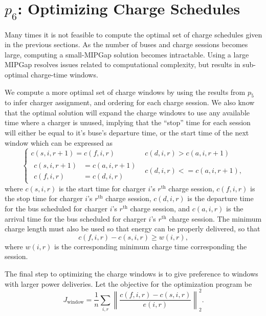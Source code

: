 \section{$p_6$: Optimizing Charge Schedules\label{sec:optimizingChargeSchedules}}
Many times it is not feasible to compute the optimal set of charge schedules given in the previous sections. As the number of buses and charge sessions becomes large, computing a small-MIPGap solution becomes intractable. Using a large MIPGap resolves issues related to computational complexity, but results in sub-optimal charge-time windows.
\par We compute a more optimal set of charge windows by using the results from $p_5$ to infer charger assignment, and ordering for each charge session. We also know that the optimal solution will expand the charge windows to use any available time where a charger is unused, implying that the ``stop'' time for each session will either be equal to it's buse's departure time, or the start time of the next window which can be expressed as
\begin{equation}\label{eqn:optChargeSchedules:eqn1}
\begin{cases}
	c(s,i,r+1) = c(f,i,r) & c(d,i,r) > c(a,i,r+1)\\[0.08in]
	\begin{aligned}
	c(s,i,r+1) &= c(a,i,r+1) \\
	c(f,i,r) &= c(d,i,r)
	\end{aligned} & c(d,i,r) <= c(a,i,r+1), 
\end{cases}
\end{equation}
where $c(s,i,r)$ is the start time for charger $i$'s $r^{\text{th}}$ charge session, $c(f,i,r)$ is the stop time for charger $i$'s $r^{\text{th}}$ charge session, $c(d,i,r)$ is the departure time for the bus scheduled for charger $i$'s $r^{\text{th}}$ charge session, and $c(a,i,r)$ is the arrival time for the bus scheduled for charger $i$'s $r^{\text{th}}$ charge session. 
The minimum charge length must also be used so that energy can be properly delivered, so that
\begin{equation}\label{eqn:optChargeSchedules:eqn2}
	c(f,i,r) - c(s,i,r) \ge w(i,r),
\end{equation}
where $w(i,r)$ is the corresponding minimum charge time corresponding the session.
\par The final step to optimizing the charge windows is to give preference to windows with larger power deliveries. Let the objective for the optimization program be 
\begin{equation}\label{eqn:optChargeSchedule:objective}
	J_{\text{window}} = \frac{1}{n}\sum_{i,r} \left \lVert \frac{c(f,i,r) - c(s,i,r)}{e(i,r)} \right \rVert^2_2.
\end{equation}
